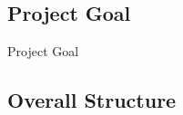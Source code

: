 \subsection{Project Goal}
\begin{frame}{Project Goal}

\end{frame}

\subsection{Overall Structure}


